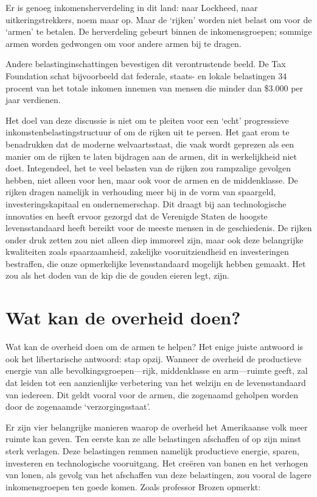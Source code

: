 \documentclass[
  a5paper,
  smalldemyvopaper,10pt,twoside,onecolumn,openright,extrafontsizes,hidelinks]{memoir}
\begin{document}
Er is genoeg inkomensherverdeling in dit land: naar Lockheed, naar
uitkeringstrekkers, noem maar op. Maar de `rijken' worden niet belast om
voor de `armen' te betalen. De herverdeling gebeurt binnen de
inkomensgroepen; sommige armen worden gedwongen om voor andere armen bij
te dragen.

Andere belastinginschattingen bevestigen dit verontrustende beeld. De
Tax Foundation schat bijvoorbeeld dat federale, staats- en lokale
belastingen 34 procent van het totale inkomen innemen van mensen die
minder dan \$3.000 per jaar verdienen.

Het doel van deze discussie is niet om te pleiten voor een `echt'
progressieve inkomstenbelastingstructuur of om de rijken uit te persen.
Het gaat erom te benadrukken dat de moderne welvaartsstaat, die vaak
wordt geprezen als een manier om de rijken te laten bijdragen aan de
armen, dit in werkelijkheid niet doet. Integendeel, het te veel belasten
van de rijken zou rampzalige gevolgen hebben, niet alleen voor hen, maar
ook voor de armen en de middenklasse. De rijken dragen namelijk in
verhouding meer bij in de vorm van spaargeld, investeringskapitaal en
ondernemerschap. Dit draagt bij aan technologische innovaties en heeft
ervoor gezorgd dat de Verenigde Staten de hoogste levensstandaard heeft
bereikt voor de meeste mensen in de geschiedenis. De rijken onder druk
zetten zou niet alleen diep immoreel zijn, maar ook deze belangrijke
kwaliteiten zoals spaarzaamheid, zakelijke vooruitziendheid en
investeringen bestraffen, die onze opmerkelijke levensstandaard mogelijk
hebben gemaakt. Het zou als het doden van de kip die de gouden eieren
legt, zijn.

\section{Wat kan de overheid doen?}\label{wat-kan-de-overheid-doen}

Wat kan de overheid doen om de armen te helpen? Het enige juiste
antwoord is ook het libertarische antwoord: stap opzij. Wanneer de
overheid de productieve energie van alle bevolkingsgroepen---rijk,
middenklasse en arm---ruimte geeft, zal dat leiden tot een aanzienlijke
verbetering van het welzijn en de levensstandaard van iedereen. Dit
geldt vooral voor de armen, die zogenaamd geholpen worden door de
zogenaamde `verzorgingsstaat'.

Er zijn vier belangrijke manieren waarop de overheid het Amerikaanse
volk meer ruimte kan geven. Ten eerste kan ze alle belastingen
afschaffen of op zijn minst sterk verlagen. Deze belastingen remmen
namelijk productieve energie, sparen, investeren en technologische
vooruitgang. Het creëren van banen en het verhogen van lonen, als gevolg
van het afschaffen van deze belastingen, zou vooral de lagere
inkomensgroepen ten goede komen. Zoals professor Brozen opmerkt:
\end{document}
